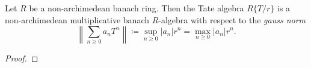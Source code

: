     \begin{proposition}\label{prop:Tate_algebra_is_a_banach_algebra_over_R}
        Let \(R\) be a non-archimedean banach ring.
        Then the Tate algebra \(R\{ T/r \} \) is a non-archimedean multiplicative banach \(R\)-algebra with respect to the \emph{gauss norm}
        \[
            \left\| \sum_{n \geq 0} a_n T^n \right\| \coloneq \sup_{n\geq 0} |a_n|r^n = \max_{n \geq 0} |a_n|r^n.
        \]
    \end{proposition}
    \begin{proof}
    \end{proof}





